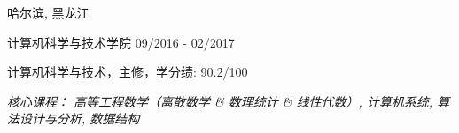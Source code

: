 \vspace{-6.0mm}

\begin{cventries}
\vspace{-1.5mm}

\cveducation
{}
{哈尔滨, 黑龙江}

\cvsubeducation
{计算机科学与技术学院}
{09/2016 - 02/2017}
{
    \begin{cvitems}
    \item {计算机科学与技术，主修，学分绩: 90.2/100}
    \item {\itshape{核心课程： 高等工程数学（离散数学 \& 数理统计 \& 线性代数）, 计算机系统, 算法设计与分析, 数据结构}}
    \end{cvitems}
}

\end{cventries}